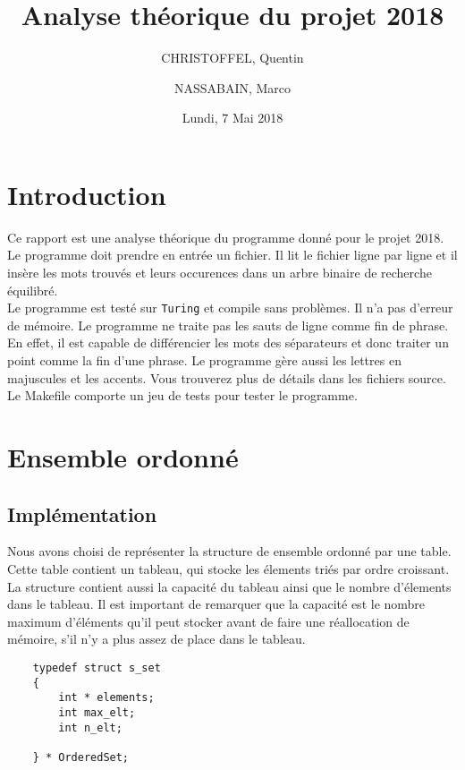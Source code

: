 \documentclass[11pt]{article}
\title{Analyse théorique du projet 2018}
\author{
    CHRISTOFFEL, Quentin
    \and
    NASSABAIN, Marco
}
\date{Lundi, 7 Mai 2018}
\begin{document}
\maketitle


\section{Introduction}
    Ce rapport est une analyse théorique du programme donné pour le projet 2018.
    Le programme doit prendre en entrée un fichier. Il lit le fichier ligne
    par ligne et il insère les mots trouvés et leurs occurences dans un arbre
    binaire de recherche équilibré.\\

    Le programme est testé sur \texttt{Turing} et compile sans problèmes. Il n'a
    pas d'erreur de mémoire. Le
    programme ne traite pas les sauts de ligne comme fin de phrase. En effet,
    il est capable de différencier les mots des séparateurs et donc traiter un
    point comme la fin d'une phrase. Le programme gère aussi les lettres en
    majuscules et les accents. Vous trouverez plus de détails dans les fichiers
    source. Le Makefile comporte un jeu de tests pour tester le programme.\\


\section{Ensemble ordonné}

    \subsection{Implémentation}
    Nous avons choisi de représenter
    la structure de ensemble ordonné par une table.
    Cette table contient un tableau, qui stocke les
    élements triés par ordre croissant. La structure contient aussi
    la capacité du tableau ainsi que le nombre d'élements dans le tableau.
    Il est important de remarquer que la capacité est le
    nombre maximum d'éléments qu'il peut stocker
    avant de faire une réallocation de mémoire, s'il n'y a plus assez
    de place dans le tableau.

    \begin{verbatim}
    typedef struct s_set
    {
        int * elements;
        int max_elt;
        int n_elt;

    } * OrderedSet;
    \end{verbatim}
\end{document}
